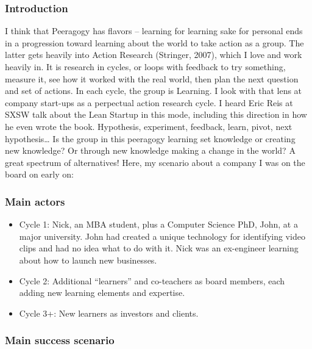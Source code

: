 \subsubsection{Introduction}

I think that Peeragogy has flavors -- learning for learning sake for
personal ends in a progression toward learning about the world to take
action as a group. The latter gets heavily into Action Research
(Stringer, 2007), which I love and work heavily in. It is research in
cycles, or loops with feedback to try something, measure it, see how it
worked with the real world, then plan the next question and set of
actions. In each cycle, the group is Learning. I look with that lens at
company start-ups as a perpectual action research cycle. I heard Eric
Reis at SXSW talk about the Lean Startup in this mode, including this
direction in how he even wrote the book. Hypothesis, experiment,
feedback, learn, pivot, next hypothesis\ldots{} Is the group in this
peeragogy learning set knowledge or creating new knowledge? Or through
new knowledge making a change in the world? A great spectrum of
alternatives! Here, my scenario about a company I was on the board on
early on:

\subsubsection{Main actors}

\begin{itemize}
\item
  Cycle 1: Nick, an MBA student, plus a Computer Science PhD, John, at a
  major university. John had created a unique technology for identifying
  video clips and had no idea what to do with it. Nick was an
  ex-engineer learning about how to launch new businesses.
\end{itemize}
\begin{itemize}
\item
  Cycle 2: Additional ``learners'' and co-teachers as board members,
  each adding new learning elements and expertise.
\end{itemize}
\begin{itemize}
\item
  Cycle 3+: New learners as investors and clients.
\end{itemize}
\subsubsection{Main success scenario}

